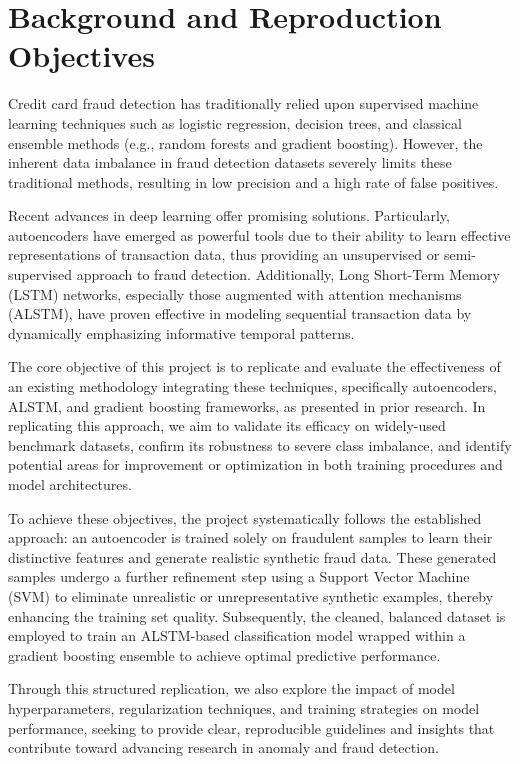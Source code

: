 \section{Background and Reproduction Objectives}

Credit card fraud detection has traditionally relied upon supervised machine learning techniques such as logistic regression, decision trees, and classical ensemble methods (e.g., random forests and gradient boosting). However, the inherent data imbalance in fraud detection datasets severely limits these traditional methods, resulting in low precision and a high rate of false positives.

Recent advances in deep learning offer promising solutions. Particularly, autoencoders have emerged as powerful tools due to their ability to learn effective representations of transaction data, thus providing an unsupervised or semi-supervised approach to fraud detection. Additionally, Long Short-Term Memory (LSTM) networks, especially those augmented with attention mechanisms (ALSTM), have proven effective in modeling sequential transaction data by dynamically emphasizing informative temporal patterns.

The core objective of this project is to replicate and evaluate the effectiveness of an existing methodology integrating these techniques, specifically autoencoders, ALSTM, and gradient boosting frameworks, as presented in prior research. In replicating this approach, we aim to validate its efficacy on widely-used benchmark datasets, confirm its robustness to severe class imbalance, and identify potential areas for improvement or optimization in both training procedures and model architectures.

To achieve these objectives, the project systematically follows the established approach: an autoencoder is trained solely on fraudulent samples to learn their distinctive features and generate realistic synthetic fraud data. These generated samples undergo a further refinement step using a Support Vector Machine (SVM) to eliminate unrealistic or unrepresentative synthetic examples, thereby enhancing the training set quality. Subsequently, the cleaned, balanced dataset is employed to train an ALSTM-based classification model wrapped within a gradient boosting ensemble to achieve optimal predictive performance.

Through this structured replication, we also explore the impact of model hyperparameters, regularization techniques, and training strategies on model performance, seeking to provide clear, reproducible guidelines and insights that contribute toward advancing research in anomaly and fraud detection.
